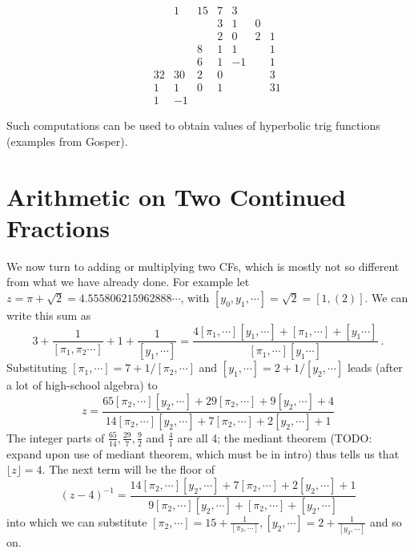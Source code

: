 \documentclass[11pt, oneside]{amsart}   	%
\begin{document}
\begin{equation}\label{eq:2dgrid}
\begin{matrix}
 & & & 1& 15&       7&  3& &\\
 & & &  &        &     3&   1& 0&\\
 & & &  &        &     2&    0& 2& 1\\
 & & &  &        8&   1&    1&   &  1\\
 & & &  &        6&   1&    -1&  & 1\\
 & & 32& 30&  2& 0&        &  &  3\\
 & &  1&   1&  0&  1&        &  & 31\\
 & &   1&  -1&   &    &        &  &
\end{matrix}
\end{equation}

Such computations can be used to obtain values of hyperbolic trig functions (examples from Gosper).


\section{Arithmetic on Two Continued Fractions}
We now turn to adding or multiplying two CFs, which is mostly not so different from what we have already done. For example let $z = \pi + \sqrt{2} = 4.555806215962888\cdots$, with $[y_0, y_1,\cdots] = \sqrt{2} = [1,(2)]$. We can write this sum as
\begin{equation}
3 + \frac{1}{[\pi_1,\pi_2\cdots]} + 1 + \frac{1}{[y_1,\cdots]} = \frac{ 4[\pi_1,\cdots][y_1,\cdots] + [\pi_1,\cdots]  + [y_1\cdots]}{ [\pi_1,\cdots][y_1\cdots] }\ .
\end{equation}
Substituting $[\pi_1,\cdots] = 7 + 1/[\pi_2,\cdots]$ and $[y_1,\cdots] = 2 + 1/[y_2,\cdots]$ leads (after a lot of high-school algebra) to 
\begin{equation}
z = \frac{65[\pi_2,\cdots] [y_2,\cdots] + 29[\pi_2,\cdots] +9[y_2,\cdots] +4}{14[\pi_2,\cdots] [y_2,\cdots] + 7[\pi_2,\cdots] +2[y_2,\cdots] +1}
\end{equation}
The integer parts of $\frac{65}{14}, \frac{29}{7}, \frac{9}{2}$ and  $\frac{4}{1}$ are all 4; the mediant theorem 
(TODO: expand upon use of mediant theorem, which must be in intro)
thus tells us that $\lfloor z \rfloor =4$. The next term will be the floor of
\begin{equation}
(z-4)^{-1} =  \frac{14[\pi_2,\cdots] [y_2,\cdots] + 7[\pi_2,\cdots] +2[y_2,\cdots] +1}{9[\pi_2,\cdots] [y_2,\cdots] + [\pi_2,\cdots] +[y_2,\cdots]}
\end{equation}
into which we can substitute  $[\pi_2,\cdots]=15+\frac{1}{[\pi_3,\cdots]},  [y_2,\cdots]=2+\frac{1}{[y_3,\cdots]}$ and so on.
\end{document}
